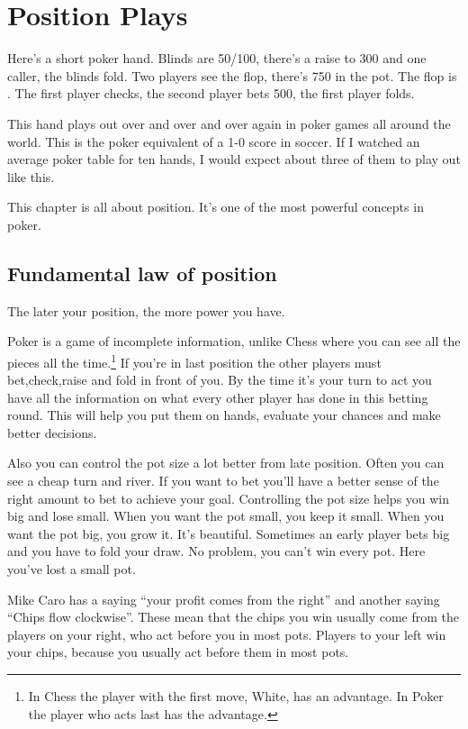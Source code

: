 \chapter{Position Plays}


Here's a short poker hand.
Blinds are 50/100, there's a raise to 300 and one caller, the blinds fold.
Two players see the flop, there's 750 in the pot. The flop is \Qh\sevs\fivec.
The first player checks, the second player bets 500, the first player folds.

This hand plays out over and over and over again in poker games all
around the world. This is the poker equivalent of a 1-0 score in soccer.
If I watched an average poker table for ten hands, I would expect
about three of them to play out like this.

This chapter is all about position. It's one of the
most powerful concepts in poker.

\section{Fundamental law of position}

The later your position, the more power you have.

Poker is a game of incomplete information, unlike Chess where you
can see all the pieces all the time.\footnote{In Chess the player
with the first move, White, has an advantage. In Poker the player
who acts last has the advantage.} If you're in last position
the other players must bet,check,raise and fold in front of you. By
the time it's your turn to act you have all the information on
what every other player has done in this betting round. This will help you
put them on hands, evaluate your chances and make better decisions.

Also you can control the pot size a lot better from late position.
Often you can see a cheap turn and river. If you want to bet
you'll have a better sense of the right amount to bet to achieve
your goal. Controlling the pot size helps you win big and lose small.
When you want the pot small, you keep it small. When you want the pot
big, you grow it. It's beautiful. Sometimes an early player
bets big and you have to fold your draw. No problem,
you can't win every pot. Here you've lost a small pot.

Mike Caro has a saying ``your profit comes from the right'' and another
saying ``Chips flow clockwise''. These mean
that the chips you win usually come from the players on your right,
who act before you in most pots. Players to your left win
your chips, because you usually act before them in most pots.

